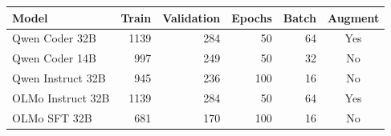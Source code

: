 \begin{tabular}{lrrrrc}\toprule
Model & Train & Validation & Epochs & Batch & Augment\\\midrule
Qwen Coder 32B & 1139 & 284 & 50 & 64 & Yes\\
Qwen Coder 14B & 997 & 249 & 50 & 32 & No\\
Qwen Instruct 32B & 945 & 236 & 100 & 16 & No\\
OLMo Instruct 32B & 1139 & 284 & 50 & 64 & Yes\\
OLMo SFT 32B & 681 & 170 & 100 & 16 & No\\
\bottomrule\end{tabular}